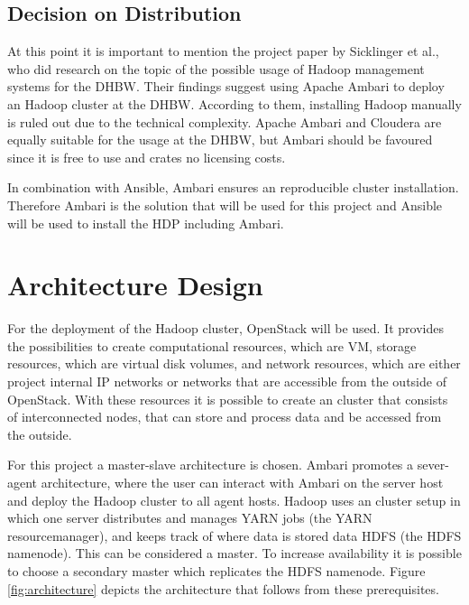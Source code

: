 \subsection{Decision on Distribution}
\label{sec:decision}

At this point it is important to mention the project paper by Sicklinger et al., 
who did research on the topic of the possible usage of Hadoop management systems for the \ac{DHBW}.
Their findings suggest using Apache Ambari to deploy an Hadoop cluster at the \ac{DHBW}.
According to them, installing Hadoop manually is ruled out due to the technical complexity.
Apache Ambari and Cloudera are equally suitable for the usage at the \ac{DHBW}, 
but Ambari should be favoured since it is free to use and crates no licensing costs.
\autocite[][p. 53f]{wi2018managementsystems}

In combination with Ansible, Ambari ensures an reproducible cluster installation. 
Therefore Ambari is the solution that will be used for this project and Ansible will be used to install the \ac{HDP} including Ambari.

\section{Architecture Design}

For the deployment of the Hadoop cluster, OpenStack will be used.
It provides the possibilities to create computational resources, which are \acs{VM}, 
storage resources, which are virtual disk volumes, 
and network resources, which are either project internal \ac{IP} networks or networks that are accessible from the outside of OpenStack.
With these resources it is possible to create an cluster that consists of interconnected nodes, 
that can store and process data and be accessed from the outside.

For this project a master-slave architecture is chosen.
Ambari promotes a sever-agent architecture, 
where the user can interact with Ambari on the server host 
and deploy the Hadoop cluster to all agent hosts.
Hadoop uses an cluster setup in which one server distributes and manages \ac{YARN} jobs (the \ac{YARN} resourcemanager), 
and keeps track of where data is stored data \ac{HDFS} (the \ac{HDFS} namenode).
This can be considered a master.
To increase availability it is possible to choose a secondary master which replicates the \ac{HDFS} namenode.
Figure \vref{fig:architecture} depicts the architecture that follows from these prerequisites.

